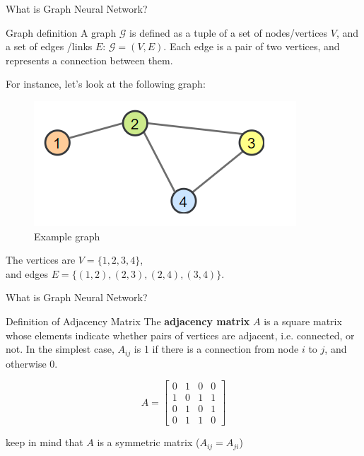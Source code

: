 \documentclass{beamer}
\begin{document}
	\begin{frame}[t]{What is Graph Neural Network?}\vspace{10pt}
	
	\begin{block}{Graph definition}
		A graph $\mathcal{G}$ is defined as a tuple of a set of nodes/vertices $V$, and a set of edges /links $E$: $\mathcal{G}=(V,E)$. Each edge is a pair of two vertices, and represents a connection between them. 
	\end{block}
	For instance, let's look at the following graph:
	\begin{figure}
		\centering
		\includegraphics[scale=0.5]{sg.png}
		\caption{Example graph}
	\end{figure}
	
	The vertices are $V=\{1,2,3,4\}$,\\ and edges $E=\{(1,2), (2,3), (2,4), (3,4)\}$.
	\end{frame}

	\begin{frame}[t]{What is Graph Neural Network?}\vspace{4pt}
	\begin{block}{Definition of Adjacency Matrix}
		\vspace{0.5em}
		The \textbf{adjacency matrix} $A$ is a square matrix whose elements indicate whether pairs of vertices are adjacent, i.e. connected, or not. In the simplest case, $A_{ij}$ is 1 if there is a connection from node $i$ to $j$, and otherwise 0.
		\vspace{0.5em}
	\end{block}
	
	$$
	A = \begin{bmatrix}
		0 & 1 & 0 & 0\\
		1 & 0 & 1 & 1\\
		0 & 1 & 0 & 1\\
		0 & 1 & 1 & 0
	\end{bmatrix}
	$$
	
	keep in mind that $A$ is a symmetric matrix ($A_{ij}=A_{ji}$)
	\end{frame}
\end{document}
